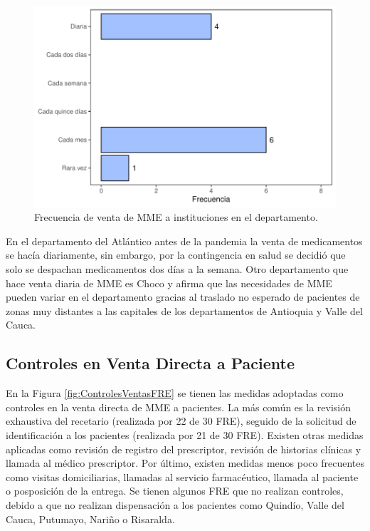 \documentclass[
  oneside]{book}
\begin{document}
\begin{figure}[t]

{\centering \includegraphics[width=0.9\linewidth]{InformeFinal_files/figure-latex/FrecVentaInstituciones-1} 

}

\caption{Frecuencia de venta de MME a instituciones en el departamento.}\label{fig:FrecVentaInstituciones}
\end{figure}

En el departamento del Atlántico antes de la pandemia la venta de medicamentos se hacía diariamente, sin embargo, por la contingencia en salud se decidió que solo se despachan medicamentos dos días a la semana. Otro departamento que hace venta diaria de MME es Choco y afirma que las necesidades de MME pueden variar en el departamento gracias al traslado no esperado de pacientes de zonas muy distantes a las capitales de los departamentos de Antioquia y Valle del Cauca.

\hypertarget{controles-en-venta-directa-a-paciente}{%
\subsection{Controles en Venta Directa a Paciente}\label{controles-en-venta-directa-a-paciente}}

En la Figura \ref{fig:ControlesVentasFRE} se tienen las medidas adoptadas como controles en la venta directa de MME a pacientes. La más común es la revisión exhaustiva del recetario (realizada por 22 de 30 FRE), seguido de la solicitud de identificación a los pacientes (realizada por 21 de 30 FRE). Existen otras medidas aplicadas como revisión de registro del prescriptor, revisión de historias clínicas y llamada al médico prescriptor. Por último, existen medidas menos poco frecuentes como visitas domiciliarias, llamadas al servicio farmacéutico, llamada al paciente o posposición de la entrega. Se tienen algunos FRE que no realizan controles, debido a que no realizan dispensación a los pacientes como Quindío, Valle del Cauca, Putumayo, Nariño o Risaralda.
\end{document}
